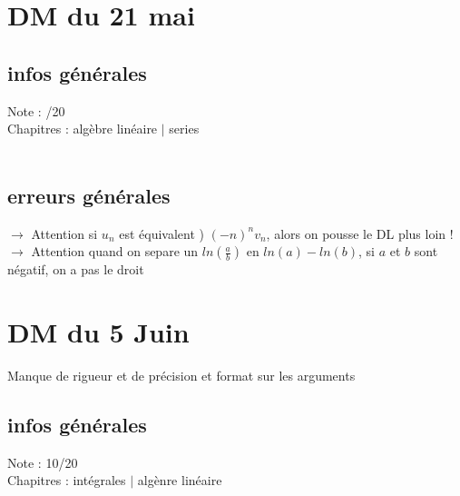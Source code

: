 \documentclass{book}
\begin{document}
\section{DM du 21 mai}

\begin{tcolorbox}[width={14cm},colback={yellow!20!white},title={\textbf{Commentaire générale sur ce DS}},colbacktitle=red!40!white,coltitle=black]

\end{tcolorbox}

\subsection{infos générales}

Note : /20 \\
Chapitres : algèbre linéaire $|$ series \\ \\

\subsection{erreurs générales}

$\rightarrow$ Attention si $u_n$ est équivalent )  $(-n)^n v_n$, alors on pousse le DL plus loin ! \\
$\rightarrow$ Attention quand on separe un $ln(\frac{a}{b})$ en $ln(a) - ln(b)$, si $a$ et $b$ sont négatif, on a pas le droit \\


\section{DM du 5 Juin}

\begin{tcolorbox}[width={14cm},colback={yellow!20!white},title={\textbf{Commentaire générale sur ce DS}},colbacktitle=red!40!white,coltitle=black]
	Manque de rigueur et de précision et format sur les arguments
\end{tcolorbox}

\subsection{infos générales}

Note : 10/20 \\
Chapitres : intégrales $|$ algènre linéaire \\ \\
\end{document}
